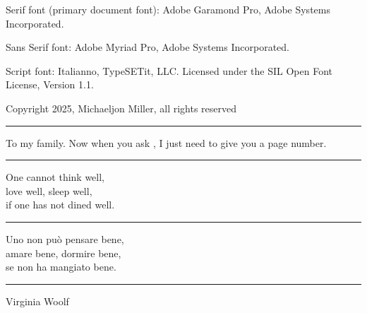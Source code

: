	\NewDocumentCommand \DedicationVerso{}{}

\else
	\NewDocumentCommand \MyTitlePage{} {\noindent \MakeTitlePage{} \clearpage}

	\NewDocumentCommand \ColophonFonts{}
	{
		Serif font (primary document font):
		Adobe Garamond Pro, \Copyright{} Adobe Systems Incorporated.\par
		Sans Serif font:
		Adobe Myriad Pro, \Copyright{} Adobe Systems Incorporated.\par
		Script font: Italianno, \Copyright{} TypeSETit, LLC. Licensed under the SIL Open Font License, Version 1.1.\par
	}

	\NewDocumentCommand \CopyrightInfo{}
	{Copyright \Copyright{} 2025, Michaeljon Miller, all rights reserved}

	\NewDocumentCommand \MyDedication{}
	{\hrule\vspace{5pt}
		To my family.  Now when you ask , I just need to give you a page number.%
		\vspace{5pt}\hrule}

	\NewDocumentCommand \DedicationVerso{}
	{
		\begin{center}
			{\FontChapterTitle
				One cannot think well, \\
				love well, sleep well, \\
				if one has not dined well.\\
				\vspace{5pt}
				\hrule
				\vspace{5pt}
				Uno non pu\`o pensare bene, \\
				amare bene, dormire bene, \\
				se  non ha mangiato bene. \\
				\vspace{5pt}
				\hrule
				\vspace{5pt}
				Virginia Woolf
			}
		\end{center}
	}
\fi

\graphicspath{{images/}{../images/}} %
\usepackage[skip=2pt, labelformat=empty, font={rm,it}]{caption} %
\captionsetup{justification=centering} %

